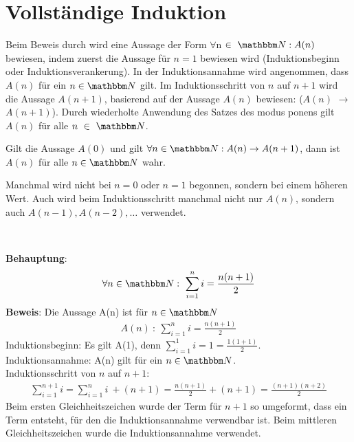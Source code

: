 \section{Vollständige Induktion}
\label{sec:Beweis - Induktion}

\begin{Unit}
Beim Beweis durch  wird eine Aussage der Form $\forall$n $\in\ \mg{N}: A(n)$
bewiesen, indem zuerst die Aussage für $n = 1$ bewiesen wird 
(Induktionsbeginn oder Induktionsverankerung). In der Induktionsannahme wird
angenommen, dass $A(n)$ für ein $n \in \NN$ gilt. Im Induktionsschritt von 
$n$ auf $n+1$ wird die Aussage $A(n+1)$, basierend auf der Aussage $A(n)$ 
bewiesen: ($A(n)$ $\rightarrow$ $A(n+1)$). Durch wiederholte Anwendung des 
Satzes des modus ponens gilt $A(n)$ für alle $n\ \in\ \mg{N}$. 

\begin{Satz}
Gilt die Aussage $A(0)$ und gilt $\forall n \in \NN: A(n) \rightarrow A(n+1)$,
dann ist $A(n)$ für alle $n \in \NN$ wahr.
\end{Satz}

Manchmal wird nicht bei $n = 0$ oder $n = 1$ begonnen, sondern bei einem 
höheren Wert. Auch wird beim Induktionsschritt manchmal nicht nur $A(n)$,
sondern auch $A(n-1), A(n-2), \ldots$ verwendet.
\end{Unit}

\begin{Unit}[Beispiel]
\ 

\textbf{Behauptung}:
\begin{align}
  \forall n\in \mg{N}:\ \sum_{i=1}^n i = \frac{n(n+1)}{2}
\end{align}
\textbf{Beweis}: Die Aussage A(n) ist für $n \in \mg{N}$
\begin{align}
  A(n)\ :\ \sum_{i=1}^n i = \frac{n(n+1)}{2}
\end{align}
Induktionsbeginn: Es gilt A(1), denn $\sum_{i=1}^1 i = 1 = 
\frac{1(1+1)}{2}$. \\[1ex]
Induktionsannahme: A(n) gilt für ein $n \in \NN$. \\[1ex]
Induktionsschritt von $n$ auf $n+1$:
\begin{align}
  \sum_{i=1}^{n+1} i = \sum_{i=1}^n i\ +(n+1) = \frac{n(n+1)}{2} + (n+1) 
  = \frac{(n+1)(n+2)}{2}
\end{align}
Beim ersten Gleichheitszeichen wurde der Term für $n+1$ so umgeformt, dass ein
Term entsteht, für den die Induktionsannahme verwendbar ist. Beim mittleren 
Gleichheitszeichen wurde die Induktionsannahme verwendet.
\end{Unit}

